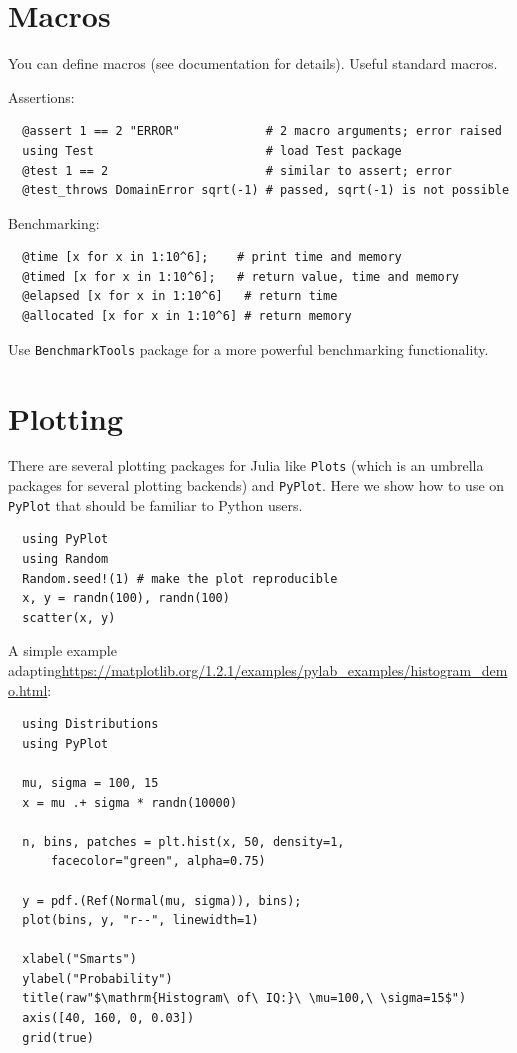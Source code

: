 \documentclass[10pt,a4paper]{article}
\begin{document}
\section{Macros}
You can define macros (see documentation for details). Useful standard macros.

Assertions:
\begin{lstlisting}
  @assert 1 == 2 "ERROR"            # 2 macro arguments; error raised
  using Test                        # load Test package
  @test 1 == 2                      # similar to assert; error
  @test_throws DomainError sqrt(-1) # passed, sqrt(-1) is not possible
\end{lstlisting}

Benchmarking:
\begin{lstlisting}
  @time [x for x in 1:10^6];    # print time and memory
  @timed [x for x in 1:10^6];   # return value, time and memory
  @elapsed [x for x in 1:10^6]   # return time
  @allocated [x for x in 1:10^6] # return memory
\end{lstlisting}
Use \lstinline|BenchmarkTools| package for a more powerful benchmarking functionality.

\section{Plotting}
There are several plotting packages for Julia like \lstinline|Plots| (which is an umbrella packages for several plotting backends) and \lstinline|PyPlot|.
Here we show how to use on \lstinline|PyPlot| that should be familiar to Python users.
\begin{lstlisting}
  using PyPlot
  using Random
  Random.seed!(1) # make the plot reproducible
  x, y = randn(100), randn(100)
  scatter(x, y)
\end{lstlisting}

A simple example adapting\newline\url{https://matplotlib.org/1.2.1/examples/pylab_examples/histogram_demo.html}:
\begin{lstlisting}
  using Distributions
  using PyPlot

  mu, sigma = 100, 15
  x = mu .+ sigma * randn(10000)

  n, bins, patches = plt.hist(x, 50, density=1,
      facecolor="green", alpha=0.75)

  y = pdf.(Ref(Normal(mu, sigma)), bins);
  plot(bins, y, "r--", linewidth=1)

  xlabel("Smarts")
  ylabel("Probability")
  title(raw"$\mathrm{Histogram\ of\ IQ:}\ \mu=100,\ \sigma=15$")
  axis([40, 160, 0, 0.03])
  grid(true)
\end{lstlisting}
\end{document}
